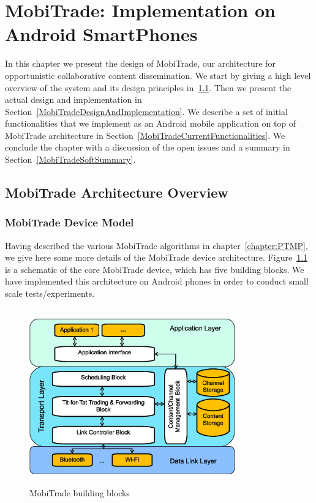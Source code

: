 \chapter{MobiTrade: Implementation on Android SmartPhones}
\label{chapter:MobiTrade}
\minitoc

In this chapter we present the design of MobiTrade, our architecture for opportunistic
collaborative content dissemination. We start by giving a high level overview of the system
and its design principles in~\ref{MobiTradeArchitecture}. Then we present the actual design and implementation
in Section~\ref{MobiTradeDesignAndImplementation}. We describe a set of initial functionalities that we implement as an Android mobile application on top of MobiTrade architecture in Section~\ref{MobiTradeCurrentFunctionalities}. We conclude the chapter with a discussion of the open issues and a summary in Section~\ref{MobiTradeSoftSummary}.


\section{MobiTrade Architecture Overview}
\label{MobiTradeArchitecture}

\subsection{MobiTrade Device Model}
\label{MobiTrade-node}

Having described the various MobiTrade algorithms in chapter~\ref{chapter:PTMP}, we give here some more details of the MobiTrade device architecture. Figure~\ref{MobiTrade-node-architecture} is a schematic of the core MobiTrade device, which has five building blocks. We have  implemented this architecture on Android phones in order to conduct small scale tests/experiments.

\begin{figure}[!h]
\centering
\includegraphics[width=3.5in,height=3in]{Chapitre5/MobiTrade_Node.eps}
\vspace{-0.1in}
\caption{MobiTrade building blocks}
\label{MobiTrade-node-architecture}
\vspace{-0.1in}
\end{figure}

